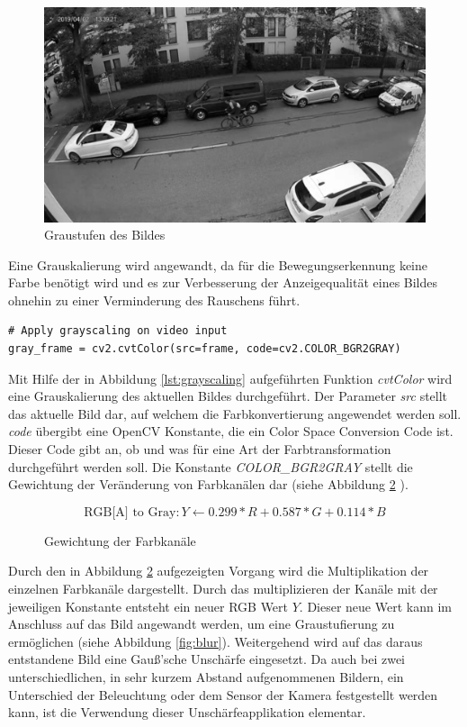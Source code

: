 \begin{figure}[htb]
	\centering
	\includegraphics[width=.9\textwidth]{images/abbildung_grayscale}
	\caption{Graustufen des Bildes}
	\label{fig:grayscale}
\end{figure}

Eine Grauskalierung wird angewandt, da für die Bewegungserkennung keine Farbe benötigt wird und es zur Verbesserung der Anzeigequalität eines Bildes ohnehin zu einer Verminderung des Rauschens führt.

\vspace*{5mm}
\begin{lstlisting}[caption={Graustufen auf das Video anwenden}, label={lst:grayscaling}]
# Apply grayscaling on video input
gray_frame = cv2.cvtColor(src=frame, code=cv2.COLOR_BGR2GRAY)
\end{lstlisting}

Mit Hilfe der in Abbildung \ref{lst:grayscaling} aufgeführten Funktion \emph{cvtColor} wird eine Grauskalierung des aktuellen Bildes durchgeführt. Der Parameter \emph{src} stellt das aktuelle Bild dar, auf welchem die Farbkonvertierung angewendet werden soll. \emph{code} übergibt eine OpenCV Konstante, die ein Color Space Conversion Code ist. Dieser Code gibt an, ob und was für eine Art der Farbtransformation durchgeführt werden soll. Die Konstante \emph{COLOR\_BGR2GRAY} stellt die Gewichtung der Veränderung von Farbkanälen dar (siehe Abbildung \ref{eq:rgbatogray} \cite{opencv_bg_subtraction4}). 

\begin{figure}[htb]
	\[\text{RGB[A] to Gray}: Y \leftarrow 0.299 * R + 0.587 * G + 0.114 * B \]
	\caption{Gewichtung der Farbkanäle}
	\label{eq:rgbatogray}
\end{figure}

Durch den in Abbildung \ref{eq:rgbatogray} aufgezeigten Vorgang wird die Multiplikation der einzelnen Farbkanäle dargestellt. Durch das multiplizieren der Kanäle mit der jeweiligen Konstante entsteht ein neuer RGB Wert $Y$. Dieser neue Wert kann im Anschluss auf das Bild angewandt werden, um eine Graustufierung zu ermöglichen \cite{opencv_bg_subtraction4} (siehe Abbildung \ref{fig:blur}). Weitergehend wird auf das daraus entstandene Bild eine Gauß'sche Unschärfe eingesetzt. Da auch bei zwei unterschiedlichen, in sehr kurzem Abstand aufgenommenen Bildern, ein Unterschied der Beleuchtung oder dem Sensor der Kamera festgestellt werden kann, ist die Verwendung dieser Unschärfeapplikation elementar. 

